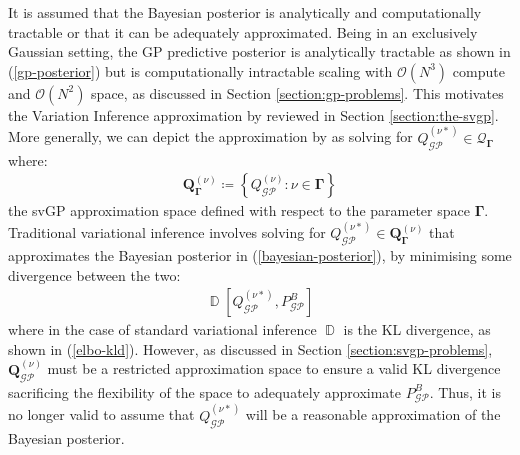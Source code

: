 \documentclass{article}
\newcommand{\D}{\operatorname{\mathbb{D}}}
\newcommand{\GP}{\operatorname{\mathcal{GP}}}
\numberwithin{equation}{section}
\begin{document}
It is assumed that the Bayesian posterior is analytically and computationally tractable or that it can be adequately approximated. Being in an exclusively Gaussian setting, the GP predictive posterior is analytically tractable as shown in (\ref{gp-posterior}) but is computationally intractable scaling with $\mathcal{O}(N^3)$ compute and $\mathcal{O}(N^2)$ space, as discussed in Section \ref{section:gp-problems}. This motivates the Variation Inference approximation by \cite{titsias2009variational} reviewed in Section \ref{section:the-svgp}. More generally, we can depict the approximation by \cite{titsias2009variational} as solving for $Q_{\GP}^{(\nu*)} \in \mathcal{Q}_{\mathbf{\Gamma}}$ where:
\begin{align}
    \boldsymbol{Q}_{\boldsymbol{\Gamma}}^{(\nu)} \coloneqq \left\{Q_{\GP}^{(\nu)}: \nu \in \mathbf{\Gamma}\right\}
    \label{svgp-space}
\end{align}
the svGP approximation space defined with respect to the parameter space $\mathbf{\Gamma}$. Traditional variational inference involves solving for $Q_{\GP}^{(\nu*)} \in \boldsymbol{Q}_{\boldsymbol{\Gamma}}^{(\nu)}$ that approximates the Bayesian posterior in (\ref{bayesian-posterior}), by minimising some divergence between the two: 
\begin{align}
\D\left[Q_{\GP}^{(\nu*)}, P_{\GP}^B\right]
\end{align}
where in the case of standard variational inference $\D$ is the KL divergence, as shown in (\ref{elbo-kld}).
However, as discussed in Section \ref{section:svgp-problems}, $\boldsymbol{Q}_{\GP}^{(\nu)}$ must be a restricted approximation space to ensure a valid KL divergence sacrificing the flexibility of the space to adequately approximate $P_{\GP}^B$. Thus, it is no longer valid to assume that $Q_{\GP}^{(\nu*)}$ will be a reasonable approximation of the Bayesian posterior.
\end{document}
